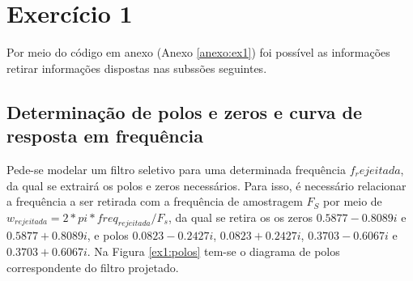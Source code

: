 \documentclass[a4paper,12pt,oneside,openany,table,xcdraw]{article}
\begin{document}
\newcommand{\thedepartment}{Faculdade de Engenharia Elétrica}
\newcommand{\thecourse}{FEELT}
\newcommand{\thetitle}{Resolução da Lista de Exercícios Extras}
\newcommand{\thetype}{Trabalho de Sinais e Sistemas II}
\newcommand{\theproftitle}{Bacharel em Engenharia Elétrica}
\newcommand{\thestudent}{Lesly Viviane Montúfar Berrios\\
\centering11811ETE001}
\newcommand{\theadvisor}{Prof. Wellington Maycon Santos Bernardes}
\newcommand{\thecity}{Uberlândia}

\thispagestyle{empty}



\onehalfspacing
\tableofcontents %
\newpage

\section{Exercício 1}
 Por meio do código em anexo (Anexo \ref{anexo:ex1}) foi possível as informações retirar informações dispostas nas subssões seguintes.
\vspace{0.3cm}

% 

\vspace{0.3cm}
\subsection{Determinação de polos e zeros e curva de resposta em frequência}
Pede-se modelar um filtro seletivo para uma determinada frequência $f_rejeitada$, da qual se extrairá os polos e zeros necessários. Para isso, é necessário relacionar a frequência a ser retirada com a frequência de amostragem $F_S$ por meio de $w_{rejeitada} = 2*pi*freq_{rejeitada}/F_s$, da qual se retira os os zeros $0.5877 - 0.8089i$ e $0.5877 + 0.8089i$, e polos $0.0823 - 0.2427i$,  $0.0823 + 0.2427i$,  $0.3703 - 0.6067i$ e $0.3703 + 0.6067i$. Na Figura \ref{ex1:polos} tem-se o diagrama de polos correspondente do filtro projetado.
\end{document}
